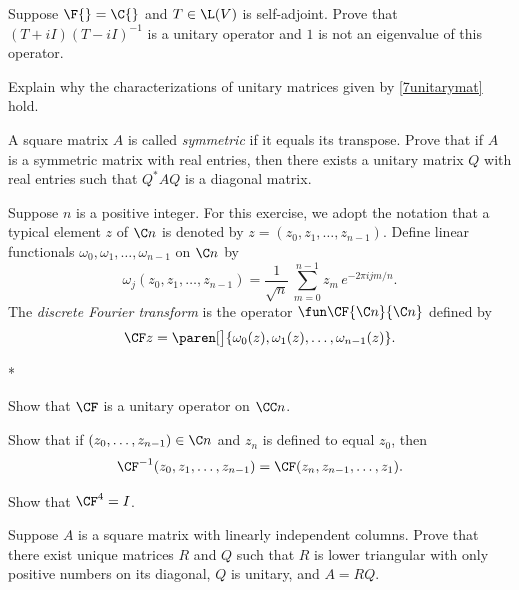\exercise
Suppose $\F{} = \C{}$ and $T \in \L(V)$ is self-adjoint. Prove that $(T + iI)(T - iI)^{-1}$ is a unitary operator and $1$ is not an eigenvalue of this operator.


\exercise
Explain why the characterizations of unitary matrices given by \ref{7unitarymat} hold.


\exercise
A square matrix $A$ is called \textit{symmetric} if it equals its transpose. Prove that if $A$ is a symmetric matrix with real entries, then there exists a unitary matrix $Q$ with real entries such that $Q^* A Q$ is a diagonal matrix.


\exercise
Suppose $n$ is a positive integer. For this exercise, we adopt the notation that a typical element $z$ of $\C n$ is denoted by
$z = (z_0, z_1, \ldots, z_{n-1})$. Define linear functionals $\omega_0, \omega_1, \ldots, \omega_{n-1}$ on $\C n$ by
\[
\omega_j(z_0, z_1, \ldots, z_{n-1}) = \frac{1}{\sqrt{n}} \, \sum_{m=0}^{n-1} z_m \,e^{-2\pi i j m/n}.
\]
The \emph{discrete Fourier transform} is the operator $\fun \CF {\C n} {\C n}$ defined by
\[
\CF z = \paren[\big]{ \omega_0(z), \omega_1(z), \ldots, \omega_{n-1}(z) }.
\]
\begin{subtheorem}*
\item
Show that $\CF$ is a unitary operator on $\CC n$.
\item
Show that if $(z_0, \ldots, z_{n-1}) \in \C n$ and $z_n$ is defined to equal $z_0$, then
\[
\CF^{-1}(z_0, z_1, \ldots, z_{n-1}) = \CF(z_n, z_{n-1}, \ldots, z_1).
\]
\item
Show that $\CF^4 = I$.
\end{subtheorem}


\exercise
Suppose $A$ is a square matrix with linearly independent columns. Prove that there exist unique matrices $R$ and $Q$ such that $R$ is lower triangular with only positive numbers on its diagonal, $Q$ is unitary, and $A = RQ$.\label{7Cholt}


